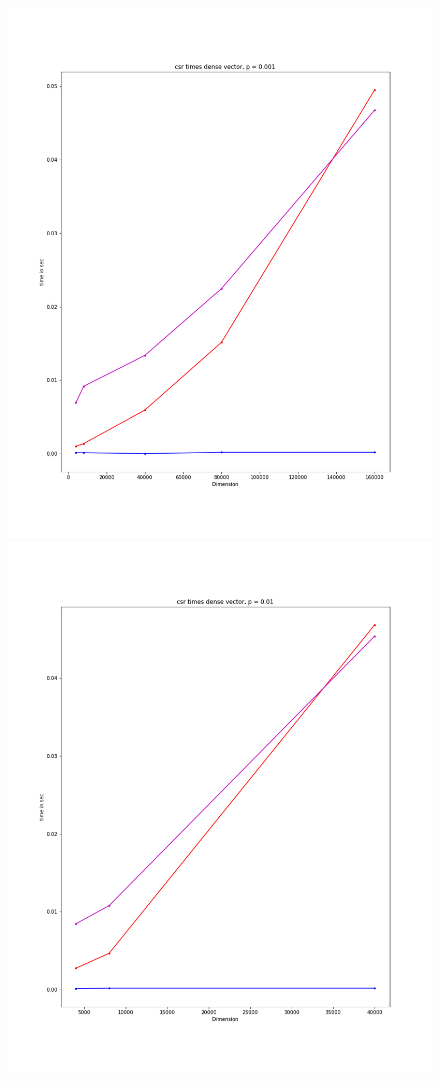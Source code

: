 \documentclass[12pt]{article}
\begin{document}
\begin{figure}[h]
  \includegraphics[scale = 0.16]{csr_dv_001.png}
  \includegraphics[scale = 0.16]{csr_dv_01.png}

\end{figure}
\end{document}
